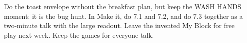 \begin{teachernote}
Do the toast envelope without the breakfast plan, but keep the WASH HANDS moment: it is the bug hunt. In Make it, do 7.1 and 7.2, and do 7.3 together as a two-minute talk with the large readout. Leave the invented My Block for free play next week. Keep the games-for-everyone talk.
\end{teachernote}
